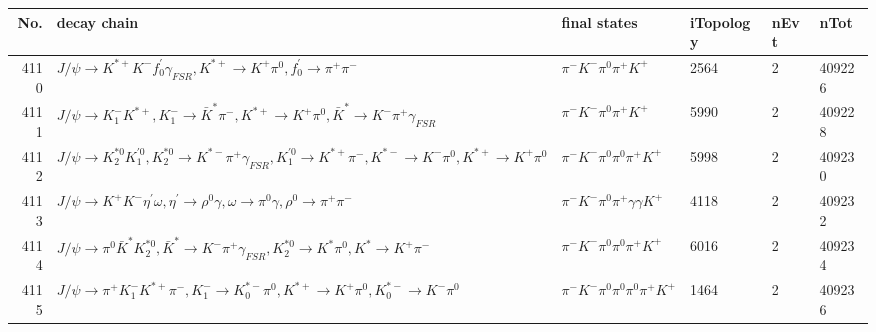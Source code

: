\begin{table}[htbp] 
\begin{center}
\begin{small}
\begin{tabular}{rlllll}\hline\hline
 No. & decay chain & final states &  iTopology & nEvt & nTot \\\hline
4110&$J/\psi       \rightarrow K^{*+}         K^{-}          f^{'}_{0}     \gamma_{FSR} , K^{*+}          \rightarrow K^{+}          \pi^{0}        , f^{'}_{0}      \rightarrow \pi^{+}        \pi^{-}        $&$\pi^{-}        K^{-}          \pi^{0}        \pi^{+}        K^{+}          $& 2564&    2&409226\\
4111&$J/\psi       \rightarrow K_{1}^{-}      K^{*+}         , K_{1}^{-}       \rightarrow \bar{K}^{*}   \pi^{-}        , K^{*+}          \rightarrow K^{+}          \pi^{0}        , \bar{K}^{*}    \rightarrow K^{-}          \pi^{+}        \gamma_{FSR} $&$\pi^{-}        K^{-}          \pi^{0}        \pi^{+}        K^{+}          $& 5990&    2&409228\\
4112&$J/\psi       \rightarrow K_2^{*0}       K_1^{'0}      , K_2^{*0}        \rightarrow K^{*-}         \pi^{+}        \gamma_{FSR} , K_1^{'0}       \rightarrow K^{*+}         \pi^{-}        , K^{*-}          \rightarrow K^{-}          \pi^{0}        , K^{*+}          \rightarrow K^{+}          \pi^{0}        $&$\pi^{-}        K^{-}          \pi^{0}        \pi^{0}        \pi^{+}        K^{+}          $& 5998&    2&409230\\
4113&$J/\psi       \rightarrow K^{+}          K^{-}          \eta^{\prime} \omega         , \eta^{\prime}  \rightarrow \rho^{0}      \gamma       , \omega          \rightarrow \pi^{0}        \gamma       , \rho^{0}       \rightarrow \pi^{+}        \pi^{-}        $&$\pi^{-}        K^{-}          \pi^{0}        \pi^{+}        \gamma       \gamma       K^{+}          $& 4118&    2&409232\\
4114&$J/\psi       \rightarrow \pi^{0}        \bar{K}^{*}   K_2^{*0}       , \bar{K}^{*}    \rightarrow K^{-}          \pi^{+}        \gamma_{FSR} , K_2^{*0}        \rightarrow K^{*}          \pi^{0}        , K^{*}           \rightarrow K^{+}          \pi^{-}        $&$\pi^{-}        K^{-}          \pi^{0}        \pi^{0}        \pi^{+}        K^{+}          $& 6016&    2&409234\\
4115&$J/\psi       \rightarrow \pi^{+}        K_{1}^{-}      K^{*+}         \pi^{-}        , K_{1}^{-}       \rightarrow K_{0}^{*-}     \pi^{0}        , K^{*+}          \rightarrow K^{+}          \pi^{0}        , K_{0}^{*-}      \rightarrow K^{-}          \pi^{0}        $&$\pi^{-}        K^{-}          \pi^{0}        \pi^{0}        \pi^{0}        \pi^{+}        K^{+}          $& 1464&    2&409236\\

\end{tabular}
\end{small}
\end{center}
\end{table}
